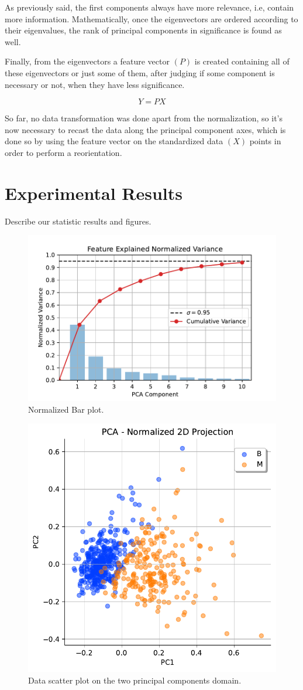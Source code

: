 \documentclass[conference]{IEEEtran}
\newcommand{\reviewUrgent}[1]{{\color{red} #1}} %
\begin{document}
As previously said, the first components always have more relevance, i.e, contain more information. Mathematically, once the eigenvectors are ordered according to their eigenvalues, the rank of principal components in significance is found as well.

Finally, from the eigenvectors a feature vector $(P)$ is created containing all of these eigenvectors or just some of them, after judging if some component is necessary or not, when they have less significance. 

\begin{equation}
    Y = P X
\end{equation}

So far, no data transformation was done apart from the normalization, so it's now necessary to recast the data along the principal component axes, which is done so by using the feature vector on the standardized data $(X)$ points in order to perform a reorientation.


\section{Experimental Results}
\reviewUrgent{Describe our statistic results and figures.}

\begin{figure}[htbp]
    \centerline{\includegraphics[width=0.5 \textwidth]{../../code/hw1/figures/5-1-PCA-10PC-variance.pdf}}
    \caption{Normalized Bar plot.}
    \label{fig:5-1-PCA-10PC-variance}
\end{figure}

\begin{figure}[htbp]
    \centerline{\includegraphics[width=0.5 \textwidth]{../../code/hw1/figures/5-2-PCA-2D-scatter.pdf}}
    \caption{Data scatter plot on the two principal components domain.}
    \label{fig:5-2-PCA-2D-scatter}
\end{figure}
\end{document}
